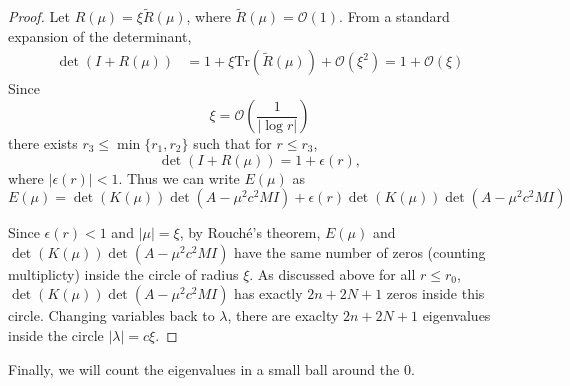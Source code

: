 \documentclass[thesis.tex]{subfiles}
\begin{document}
\begin{lemma}
\begin{proof}
Let $R(\mu) = \xi \tilde{R}(\mu)$, where $\tilde{R}(\mu) = \mathcal{O}(1)$. From a standard expansion of the determinant, 
\begin{align*}
\det(I + R(\mu)) &= 1 + \xi \text{Tr}(\tilde{R}(\mu)) + \mathcal{O}(\xi^2) = 1 + \mathcal{O}(\xi)
\end{align*}
Since 
\[
\xi = \mathcal{O}\left( \frac{1}{|\log r|} \right)
\]
there exists $r_3 \leq \min\{r_1, r_2\}$ such that for $r \leq r_3$, 
\[
\det(I + R(\mu)) = 1 + \epsilon(r),
\]
where $|\epsilon(r)| < 1$. Thus we can write $E(\mu)$ as
\begin{equation}
E(\mu) = \det(K(\mu))\det(A - \mu^2c^2 MI) + \epsilon(r) \det(K(\mu))\det(A - \mu^2c^2 MI)
\end{equation}

Since $\epsilon(r) < 1$ and $|\mu| = \xi$, by Rouch\'e's theorem, $E(\mu)$ and $\det(K(\mu))\det(A - \mu^2 c^2 MI)$ have the same number of zeros (counting multiplicty) inside the circle of radius $\xi$. As discussed above for all $r \leq r_0$, $\det(K(\mu))\det(A - \mu^2 c^2 MI)$ has exactly $2n + 2N + 1$ zeros inside this circle. Changing variables back to $\lambda$, there are exaclty $2n + 2N + 1$ eigenvalues inside the circle $|\lambda| = c \xi$. 
\end{proof}
\end{lemma}

Finally, we will count the eigenvalues in a small ball around the 0.
\end{document}
